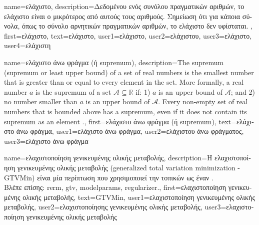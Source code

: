 {name={\foreignlanguage{greek}{ελάχιστο}},
	description={\foreignlanguage{greek}{Δεδομένου ενός συνόλου πραγματικών αριθμών,} 
		\foreignlanguage{greek}{το ελάχιστο είναι ο μικρότερος από αυτούς τους αριθμούς. Σημείωση ότι 
		για κάποια σύνολα, όπως το σύνολο αρνητικών πραγματικών αριθμών, το ελάχιστο δεν υφίσταται.} },
	first={\foreignlanguage{greek}{ελάχιστο}},
	text={\foreignlanguage{greek}{ελάχιστο}},
	user1={\foreignlanguage{greek}{ελάχιστο}}, %
	user2={\foreignlanguage{greek}{ελάχιστου}}, %
	user3={\foreignlanguage{greek}{ελάχιστο}}, %
	user4={\foreignlanguage{greek}{ελάχιστη}} %
}

{name={\foreignlanguage{greek}{ελάχιστο άνω φράγμα (ή} supremum)},
	description={The supremum 
		(supremum or least upper bound) of a set of real numbers is 
		the smallest number that is greater than or equal to every element in the set. More formally, a 
		real number $a$ is the supremum of a set $\mathcal{A} \subseteq \mathbb{R}$ if: 1) $a$ 
		is an upper bound of $\mathcal{A}$; and 2) no number smaller than $a$ is an upper bound of $\mathcal{A}$. 
		Every non-empty set of real numbers that is bounded above has a supremum, even if it does 
		not contain its supremum as an element \cite[Sec.~1.4]{RudinBookPrinciplesMatheAnalysis}.},
	first={\foreignlanguage{greek}{ελάχιστο άνω φράγμα (ή} supremum)},
	text={\foreignlanguage{greek}{ελάχιστο άνω φράγμα}},
	user1={\foreignlanguage{greek}{ελάχιστο άνω φράγμα}}, %
    	user2={\foreignlanguage{greek}{ελάχιστου άνω φράγματος}}, %
    	user3={\foreignlanguage{greek}{ελάχιστο άνω φράγμα}} %
}

{name={\foreignlanguage{greek}{ελαχιστοποίηση γενικευμένης ολικής μεταβολής}},
	description={\foreignlanguage{greek}{Η ελαχιστοποίηση γενικευμένης ολικής 
		μεταβολής} 
		(generalized total variation minimization - GTVMin) \foreignlanguage{greek}{είναι μία περίπτωση} 
		 \foreignlanguage{greek}{που χρησιμοποιεί την}  
		\foreignlanguage{greek}{τοπικών}  
		\foreignlanguage{greek}{ως έναν}  \cite{ClusteredFLTVMinTSP}.\\
		\foreignlanguage{greek}{Βλέπε επίσης:} \gls{rerm}, \gls{gtv}, \glspl{modelparam}, \gls{regularizer}.},
	first={\foreignlanguage{greek}{ελαχιστοποίηση γενικευμένης ολικής μεταβολής}},
	text={GTVMin},
	user1={\foreignlanguage{greek}{ελαχιστοποίηση γενικευμένης ολικής μεταβολής}}, %
    	user2={\foreignlanguage{greek}{ελαχιστοποίησης γενικευμένης ολικής μεταβολής}}, %
	user3={\foreignlanguage{greek}{ελαχιστοποίηση γενικευμένης ολικής μεταβολής}} %
}

